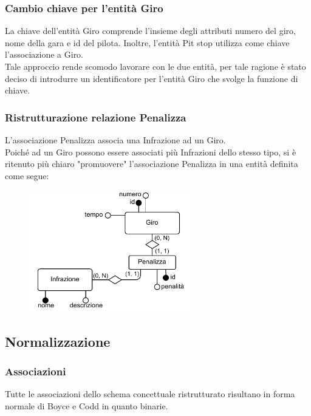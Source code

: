 \documentclass[11pt]{article}
\begin{document}
\subsubsection{Cambio chiave per l'entità Giro}
La chiave dell'entità Giro comprende l'insieme degli attributi numero del giro, nome della gara e id del pilota. Inoltre, l'entità Pit stop utilizza come chiave l'associazione a Giro.\\
Tale approccio rende scomodo lavorare con le due entità, per tale ragione è stato deciso di introdurre un identificatore per l'entità Giro che svolge la funzione di chiave.

\subsubsection{Ristrutturazione relazione Penalizza}
L'associazione Penalizza associa una Infrazione ad un Giro.\\
Poiché ad un Giro possono essere associati più Infrazioni dello stesso tipo, si è ritenuto più chiaro "promuovere" l'associazione Penalizza in una entità definita come segue:

\begin{figure}[H]
    \centering
    \includegraphics[width=7cm]{../er/penalizza.pdf}
\end{figure}

\subsection{Normalizzazione}
\subsubsection{Associazioni}
Tutte le associazioni dello schema concettuale ristrutturato risultano in forma normale di Boyce e Codd in quanto binarie.
\end{document}
